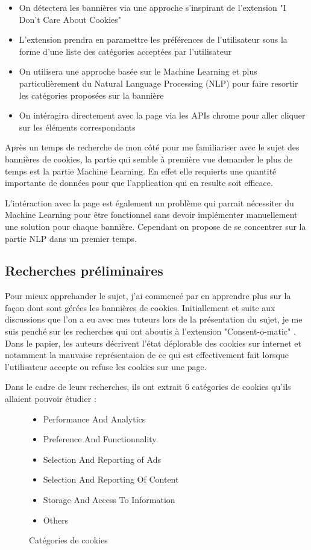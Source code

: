 \documentclass[oneside,a4paper,12pt]{article}
\begin{document}
	\begin{itemize}
		\item On détectera les bannières via une approche s'inspirant de l'extension "I Don't Care About Cookies"
		\item L'extension prendra en paramettre les préférences de l'utilisateur sous la forme d'une liste des catégories acceptées par l'utilisateur
		\item On utilisera une approche basée sur le Machine Learning et plus particulièrement du Natural Language Processing (NLP) pour faire resortir les catégories proposées sur la bannière
		\item On intéragira directement avec la page via les APIs chrome pour aller cliquer sur les éléments correspondants
	\end{itemize}

	Après un temps de recherche de mon côté pour me familiariser avec le sujet des bannières de cookies, la partie qui semble à première vue demander le plus de temps est la partie Machine Learning. En effet elle requierts une quantité importante de données pour que l'application qui en resulte soit efficace.
	
	L'intéraction avec la page est également un problème qui parrait nécessiter du Machine Learning pour être fonctionnel sans devoir implémenter manuellement une solution pour chaque bannière. Cependant on propose de se concentrer sur la partie NLP dans un premier temps.
	
	\subsection{Recherches préliminaires}
	
	Pour mieux apprehander le sujet, j'ai commencé par en apprendre plus sur la façon dont sont gérées les bannières de cookies. 
	Initiallement et suite aux discussions que l'on a eu avec mes tuteurs lors de la présentation du sujet, je me suis penché sur les recherches qui ont aboutis à l'extension "Consent-o-matic" \cite{consentomatic}.
	Dans le papier, les auteurs décrivent l'état déplorable des cookies sur internet et notamment la mauvaise représentaion de ce qui est effectivement fait lorsque l'utilisateur accepte ou refuse les cookies sur une page.
	
	Dans le cadre de leurs recherches, ils ont extrait 6 catégories de cookies qu'ils allaient pouvoir étudier :
	\begin{figure}[h]
		\centering
		\label{categories}
		\begin{itemize}
			\item Performance And Analytics
			\item Preference And Functionnality
			\item Selection And Reporting of Ads
			\item Selection And Reporting Of Content
			\item Storage And Access To Information
			\item Others
		\end{itemize}
		\caption{Catégories de cookies}
	\end{figure}
	
\end{document}
